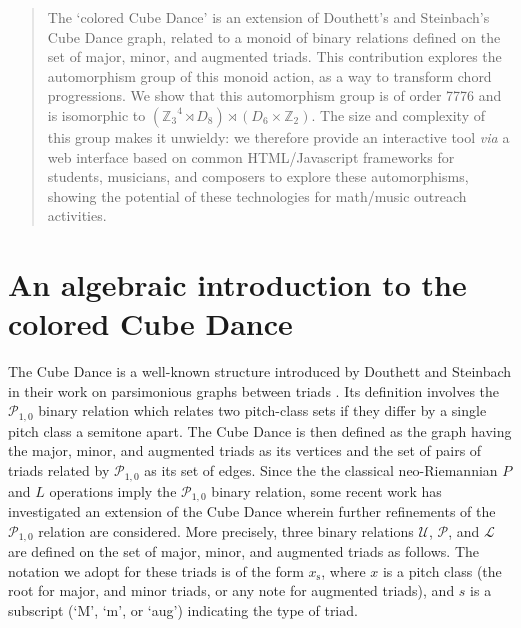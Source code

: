 \documentclass[10pt]{amsart}
\begin{document}


\begin{abstract}
The `colored Cube Dance' is an extension of Douthett's and Steinbach's Cube Dance graph, related to a monoid of binary relations defined on the set of major, minor, and augmented triads. This contribution explores the automorphism group of this monoid action, as a way to transform chord progressions. We show that this automorphism group is of order 7776 and is isomorphic to $({\mathbb{Z}_3}^4 \rtimes D_8) \rtimes (D_6 \times \mathbb{Z}_2)$. The size and complexity of this group makes it unwieldy: we therefore provide an interactive tool \textit{via} a web interface based on common HTML/Javascript frameworks for students, musicians, and composers to explore these automorphisms, showing the potential of these technologies for math/music outreach activities. 
\end{abstract}

\maketitle
\section{An algebraic introduction to the colored Cube Dance}

The Cube Dance is a well-known structure introduced by Douthett and Steinbach in their work on parsimonious graphs between triads \cite{Douthett1998}. Its definition involves the $\mathcal{P}_{1,0}$ binary relation which relates two pitch-class sets if they differ by a single pitch class a semitone apart. The Cube Dance is then defined as the graph having the major, minor, and augmented triads as its vertices and the set of pairs of triads related by $\mathcal{P}_{1,0}$ as its set of edges. Since the the classical neo-Riemannian $P$ and $L$ operations imply the $\mathcal{P}_{1,0}$ binary relation, some recent work \cite{Popoff2018} has investigated an extension of the Cube Dance wherein further refinements of the $\mathcal{P}_{1,0}$ relation are considered. More precisely, three binary relations $\mathcal{U}$, $\mathcal{P}$, and $\mathcal{L}$ are defined on the set of major, minor, and augmented triads as follows. The notation we adopt for these triads is of the form $x_{\text{s}}$, where $x$ is a pitch class (the root for major, and minor triads, or any note for augmented triads), and $s$ is a subscript (`M', `m', or `aug') indicating the type of triad.
\end{document}
